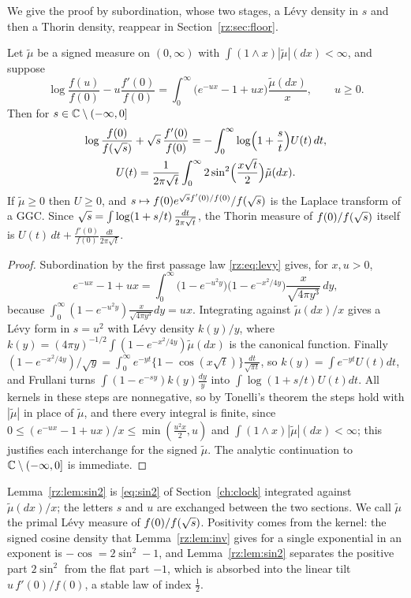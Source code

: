 We give the proof by subordination, whose two stages, a L\'evy density in $s$ and then a Thorin density, reappear in Section~\ref{rz:sec:floor}.

\begin{lemma}[Lemma~\ref{rz:lem:P1} in the scaling $s=u^2$]\label{rz:lem:sin2}
Let $\tilde\mu$ be a signed measure on $(0,\infty)$ with $\int(1\wedge x)|\tilde\mu|(dx)<\infty$, and suppose
\[
\log\frac{f(u)}{f(0)}-u\frac{f'(0)}{f(0)}=\int_0^\infty\bigl(e^{-ux}-1+ux\bigr)\frac{\tilde\mu(dx)}x,\qquad u\ge0 .
\]
Then for $s\in\mathbb{C}\setminus(-\infty,0]$
\begin{gather*}
\log\frac{f(0)}{f(\sqrt{s})}+\sqrt{s}\,\frac{f'(0)}{f(0)}=-\int_0^\infty\log\Bigl(1+\frac st\Bigr)U(t)\,dt,\\
U(t)=\frac{1}{2\pi\sqrt t}\int_0^\infty2\sin^2\Bigl(\frac{x\sqrt t}2\Bigr)\tilde\mu(dx).
\end{gather*}
If $\tilde\mu\ge0$ then $U\ge0$, and $s\mapsto f(0)e^{\sqrt{s} f'(0)/f(0)}/f(\sqrt{s})$ is the Laplace transform of a GGC. Since $\sqrt{s}=\int\log(1+s/t)\,\frac{dt}{2\pi\sqrt t}$, the Thorin measure of $f(0)/f(\sqrt{s})$ itself is $U(t)\,dt+\frac{f'(0)}{f(0)}\frac{dt}{2\pi\sqrt t}$.
\end{lemma}

\begin{proof}
Subordination by the first passage law \eqref{rz:eq:levy} gives, for $x,u>0$,
\[
e^{-ux}-1+ux=\int_0^\infty\bigl(1-e^{-u^2y}\bigr)\bigl(1-e^{-x^2/4y}\bigr)\frac{x}{\sqrt{4\pi y^3}}\,dy,
\]
because $\int_0^\infty(1-e^{-u^2y})\frac{x}{\sqrt{4\pi y^3}}dy=ux$. Integrating against $\tilde\mu(dx)/x$ gives a L\'evy form in $s=u^2$ with L\'evy density $k(y)/y$, where $k(y)=(4\pi y)^{-1/2}\int(1-e^{-x^2/4y})\tilde\mu(dx)$ is the canonical function. Finally $(1-e^{-x^2/4y})/\sqrt y=\int_0^\infty e^{-yt}\{1-\cos(x\sqrt t)\}\frac{dt}{\sqrt{\pi t}}$, so $k(y)=\int e^{-yt}U(t)dt$, and Frullani turns $\int(1-e^{-sy})k(y)\frac{dy}y$ into $\int\log(1+s/t)U(t)dt$. All kernels in these steps are nonnegative, so by Tonelli's theorem the steps hold with $|\tilde\mu|$ in place of $\tilde\mu$, and there every integral is finite, since $0\le(e^{-ux}-1+ux)/x\le\min(\frac{u^2x}2,u)$ and $\int(1\wedge x)|\tilde\mu|(dx)<\infty$; this justifies each interchange for the signed $\tilde\mu$. The analytic continuation to $\mathbb{C}\setminus(-\infty,0]$ is immediate.
\end{proof}

Lemma~\ref{rz:lem:sin2} is \eqref{eq:sin2} of Section~\ref{ch:clock} integrated against $\tilde\mu(dx)/x$; the letters $s$ and $u$ are exchanged between the two sections. We call $\tilde\mu$ the primal L\'evy measure of $f(0)/f(\sqrt{s})$. Positivity comes from the kernel: the signed cosine density that Lemma~\ref{rz:lem:inv} gives for a single exponential in an exponent is $-\cos=2\sin^2-1$, and Lemma~\ref{rz:lem:sin2} separates the positive part $2\sin^2$ from the flat part $-1$, which is absorbed into the linear tilt $u\,f'(0)/f(0)$, a stable law of index $\frac12$.

